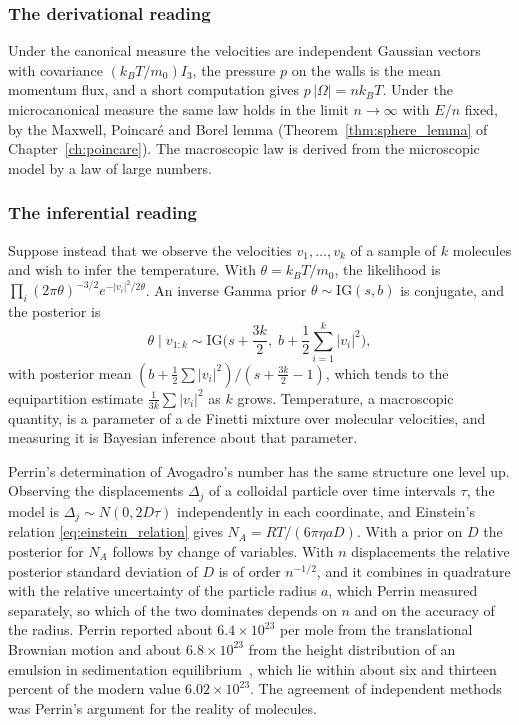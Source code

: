 \subsubsection*{The derivational reading} Under the canonical measure the velocities are independent Gaussian vectors with covariance $(k_BT/m_0)I_3$, the pressure $p$ on the walls is the mean momentum flux, and a short computation gives $p\,|\Omega| = nk_BT$. Under the microcanonical measure the same law holds in the limit $n\to\infty$ with $E/n$ fixed, by the Maxwell, Poincar\'e and Borel lemma (Theorem~\ref{thm:sphere_lemma} of Chapter~\ref{ch:poincare}). The macroscopic law is derived from the microscopic model by a law of large numbers.

\subsubsection*{The inferential reading} Suppose instead that we observe the velocities $v_1,\dots,v_k$ of a sample of $k$ molecules and wish to infer the temperature. With $\theta = k_BT/m_0$, the likelihood is $\prod_i(2\pi\theta)^{-3/2}e^{-|v_i|^2/2\theta}$. An inverse Gamma prior $\theta\sim\mathrm{IG}(s,b)$ is conjugate, and the posterior is
\[
\theta\mid v_{1:k}\sim\mathrm{IG}\Big(s+\frac{3k}{2},\;b+\frac12\sum_{i=1}^k|v_i|^2\Big),
\]
with posterior mean $(b+\frac12\sum|v_i|^2)/(s+\frac{3k}{2}-1)$, which tends to the equipartition estimate $\frac{1}{3k}\sum|v_i|^2$ as $k$ grows. Temperature, a macroscopic quantity, is a parameter of a de Finetti mixture over molecular velocities, and measuring it is Bayesian inference about that parameter.

Perrin's determination of Avogadro's number has the same structure one level up. Observing the displacements $\Delta_j$ of a colloidal particle over time intervals $\tau$, the model is $\Delta_j\sim N(0,2D\tau)$ independently in each coordinate, and Einstein's relation \eqref{eq:einstein_relation} gives $N_A = RT/(6\pi\eta aD)$. With a prior on $D$ the posterior for $N_A$ follows by change of variables. With $n$ displacements the relative posterior standard deviation of $D$ is of order $n^{-1/2}$, and it combines in quadrature with the relative uncertainty of the particle radius $a$, which Perrin measured separately, so which of the two dominates depends on $n$ and on the accuracy of the radius. Perrin reported about $6.4\times10^{23}$ per mole from the translational Brownian motion and about $6.8\times10^{23}$ from the height distribution of an emulsion in sedimentation equilibrium~\cite{perrin1926}, which lie within about six and thirteen percent of the modern value $6.02\times10^{23}$. The agreement of independent methods was Perrin's argument for the reality of molecules.

